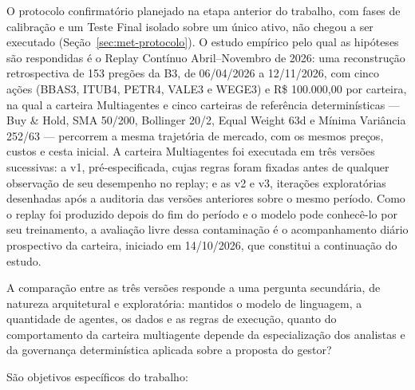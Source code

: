 \documentclass{eic-bcc-tcc}
\begin{document}
O protocolo confirmatório planejado na etapa anterior do trabalho, com fases de calibração e um Teste Final isolado sobre um único ativo, não chegou a ser executado (Seção~\ref{sec:met-protocolo}). O estudo empírico pelo qual as hipóteses são respondidas é o Replay Contínuo Abril--Novembro de 2026: uma reconstrução retrospectiva de 153 pregões da B3, de 06/04/2026 a 12/11/2026, com cinco ações (BBAS3, ITUB4, PETR4, VALE3 e WEGE3) e R\$ 100.000,00 por carteira, na qual a carteira Multiagentes e cinco carteiras de referência determinísticas --- Buy \& Hold, SMA 50/200, Bollinger 20/2, Equal Weight 63d e Mínima Variância 252/63 --- percorrem a mesma trajetória de mercado, com os mesmos preços, custos e cesta inicial. A carteira Multiagentes foi executada em três versões sucessivas: a v1, pré-especificada, cujas regras foram fixadas antes de qualquer observação de seu desempenho no replay; e as v2 e v3, iterações exploratórias desenhadas após a auditoria das versões anteriores sobre o mesmo período. Como o replay foi produzido depois do fim do período e o modelo pode conhecê-lo por seu treinamento, a avaliação livre dessa contaminação é o acompanhamento diário prospectivo da carteira, iniciado em 14/10/2026, que constitui a continuação do estudo.

A comparação entre as três versões responde a uma pergunta secundária, de natureza arquitetural e exploratória: mantidos o modelo de linguagem, a quantidade de agentes, os dados e as regras de execução, quanto do comportamento da carteira multiagente depende da especialização dos analistas e da governança determinística aplicada sobre a proposta do gestor?

São objetivos específicos do trabalho:
\end{document}
